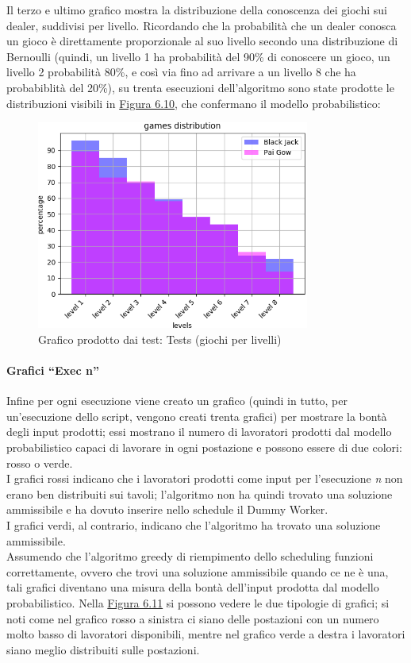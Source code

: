     \FloatBarrier
    \noindent
    Il terzo e ultimo grafico mostra la distribuzione della conoscenza dei giochi sui dealer, suddivisi per livello. Ricordando che la probabilità che un dealer conosca un gioco è direttamente proporzionale al suo livello secondo una distribuzione di Bernoulli (quindi, un livello 1 ha probabilità del 90\% di conoscere un gioco, un livello 2 probabilità 80\%, e così via fino ad arrivare a un livello 8 che ha probabiblità del 20\%), su trenta esecuzioni dell’algoritmo sono state prodotte le distribuzioni visibili in \hyperref[fig610]{Figura 6.10}, che confermano il modello probabilistico:
    \begin{figure}[!h]
        \label{fig610}
        \centering
        \includegraphics[width=0.8\textwidth,keepaspectratio]{../immagini/distr_games.png}
        \caption{Grafico prodotto dai test: Tests (giochi per livelli)}
    \end{figure}
    \FloatBarrier
    \noindent
    
    \paragraph{Grafici ``Exec n''} Infine per ogni esecuzione viene creato un grafico (quindi in tutto, per un'esecuzione dello script, vengono creati trenta grafici) per mostrare la bontà degli input prodotti; essi mostrano il numero di lavoratori prodotti dal modello probabilistico capaci di lavorare in ogni postazione e possono essere di due colori: rosso o verde.\\
    I grafici rossi indicano che i lavoratori prodotti come input per l'esecuzione \textit{n} non erano ben distribuiti sui tavoli; l'algoritmo non ha quindi trovato una soluzione ammissibile e ha dovuto inserire nello schedule il Dummy Worker. \\
    I grafici verdi, al contrario, indicano che l'algoritmo ha trovato una soluzione ammissibile.\\
    Assumendo che l'algoritmo greedy di riempimento dello scheduling funzioni correttamente, ovvero che trovi una soluzione ammissibile quando ce ne è una, tali grafici diventano una misura della bontà dell'input prodotta dal modello probabilistico.
    Nella \hyperref[fig611]{Figura 6.11} si possono vedere le due tipologie di grafici; si noti come nel grafico rosso a sinistra ci siano delle postazioni con un numero molto basso di lavoratori disponibili, mentre nel grafico verde a destra i lavoratori siano meglio distribuiti sulle postazioni.
    
